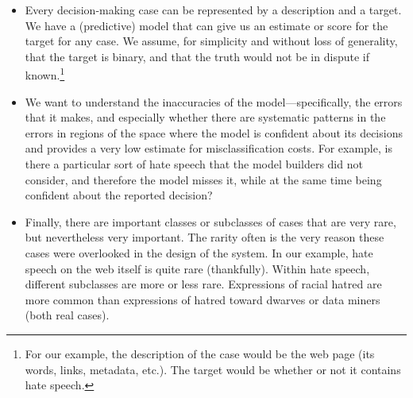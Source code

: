 \begin{itemize}
\itemsep=0.0in
\item Every decision-making case can be represented by a description
  and a target.  We have a (predictive) model that can give us an estimate or
  score for the target for any case.  We assume, for
  simplicity and without loss of generality, that the target is binary, and that the truth would not
  be in dispute if known.\footnote{For our example, the
  description of the case would be the web page (its words, links,
  metadata, etc.).  The target would be whether or not it
  contains hate speech.}

\item We want to understand the inaccuracies of the
  model---specifically, the errors that it makes, and especially
  whether there are systematic patterns in the errors in regions of the 
  space where the model is confident about its decisions and provides a very 
  low estimate for misclassification costs.  For example,
  is there a particular sort of hate speech that the model builders
  did not consider, and therefore the model misses it, while at the same
  time being confident about the reported decision?




\item Finally, there are important classes or subclasses of cases that
  are very rare, but nevertheless very important.  The rarity often is
  the very reason these cases were overlooked in the design of the
  system.  In our example, hate speech on the web itself is quite
  rare (thankfully).  Within hate speech, different subclasses are
  more or less rare.  Expressions of racial hatred are more common
  than expressions of hatred toward dwarves or data miners (both real cases).

\end{itemize}

